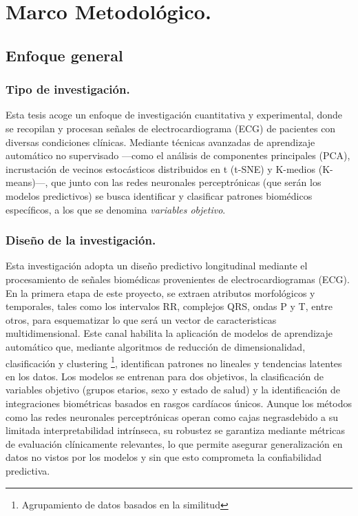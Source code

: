 \documentclass[12pt,letterpaper,oneside,openright]{book}
\begin{document}
\chapter{Marco Metodológico.}

\section{Enfoque general}
\subsection{Tipo de investigación.}

Esta tesis acoge un enfoque de investigación cuantitativa y experimental, donde se recopilan y procesan señales de electrocardiograma (ECG) de pacientes con diversas condiciones clínicas. Mediante técnicas avanzadas de aprendizaje automático no supervisado ---como el análisis de componentes principales (PCA), incrustación de vecinos estocásticos distribuidos en t (t-SNE) y K-medios (K-means)---, que junto con las redes neuronales perceptrónicas (que serán los modelos predictivos) se busca identificar y clasificar patrones biomédicos específicos, a los que se denomina \emph{variables objetivo}.

\subsection{Diseño de la investigación.}
Esta investigación adopta un diseño predictivo longitudinal mediante el procesamiento de señales biomédicas provenientes de electrocardiogramas (ECG). En la primera etapa de este proyecto, se extraen atributos morfológicos y temporales, tales como los intervalos RR, complejos QRS, ondas P y T, entre otros, para esquematizar lo que será un vector de caracteristicas multidimensional. Este canal habilita la aplicación de modelos de aprendizaje automático que, mediante algoritmos de reducción de dimensionalidad, clasificación y clustering \footnote{Agrupamiento de datos basados en la similitud}, identifican patrones no lineales y tendencias latentes en los datos. Los modelos se entrenan para dos objetivos, la clasificación de variables objetivo (grupos etarios, sexo y estado de salud) y la identificación de integraciones biométricas basados en rasgos cardíacos únicos. Aunque los métodos como las redes neuronales perceptrónicas operan como \guillemetleft cajas negras\guillemetright debido a su limitada interpretabilidad intrínseca, su robustez se garantiza mediante métricas de evaluación clínicamente relevantes, lo que permite asegurar generalización en datos no vistos por los modelos y sin que esto comprometa la confiabilidad predictiva.
\end{document}
